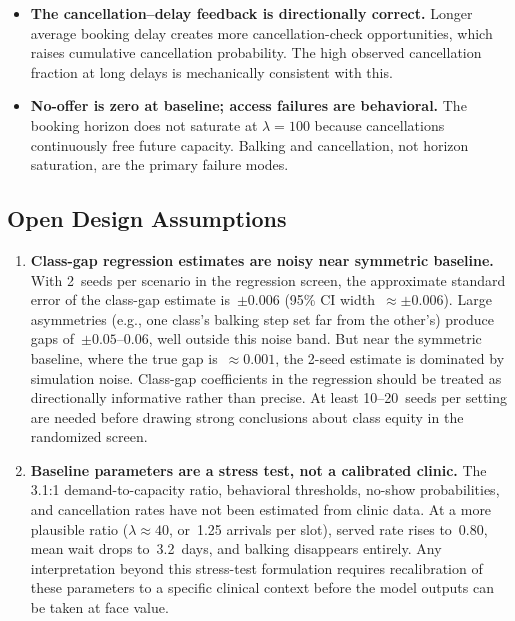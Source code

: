 \documentclass[11pt]{article}
\begin{document}
\begin{itemize}[leftmargin=1.5em, itemsep=3pt]
\item \textbf{The cancellation--delay feedback is directionally correct.}
Longer average booking delay creates more cancellation-check opportunities,
which raises cumulative cancellation probability. The high observed
cancellation fraction at long delays is mechanically consistent with this.

\item \textbf{No-offer is zero at baseline; access failures are behavioral.}
The booking horizon does not saturate at $\lambda = 100$ because
cancellations continuously free future capacity. Balking and cancellation,
not horizon saturation, are the primary failure modes.
\end{itemize}

\subsection{Open Design Assumptions}

\vspace{6pt}
\begin{checkenv}
\begin{enumerate}[leftmargin=1.5em, itemsep=4pt]

\item \textbf{Class-gap regression estimates are noisy near symmetric baseline.}
With 2~seeds per scenario in the regression screen, the approximate standard
error of the class-gap estimate is~$\pm 0.006$ (95\% CI width~$\approx
\pm 0.006$). Large asymmetries (e.g., one class's balking step set far from
the other's) produce gaps of~$\pm 0.05$--$0.06$, well outside this noise
band. But near the symmetric baseline, where the true gap is~$\approx 0.001$,
the 2-seed estimate is dominated by simulation noise. Class-gap coefficients
in the regression should be treated as directionally informative rather than
precise. At least 10--20~seeds per setting are needed before drawing strong
conclusions about class equity in the randomized screen.

\item \textbf{Baseline parameters are a stress test, not a calibrated clinic.}
The 3.1:1 demand-to-capacity ratio, behavioral thresholds, no-show
probabilities, and cancellation rates have not been estimated from clinic
data. At a more plausible ratio ($\lambda \approx 40$, or~1.25 arrivals per
slot), served rate rises to~0.80, mean wait drops to~3.2~days, and balking
disappears entirely. Any interpretation beyond this stress-test formulation requires
recalibration of these parameters to a specific clinical context before the
model outputs can be taken at face value.

\end{enumerate}
\end{checkenv}
\end{document}
